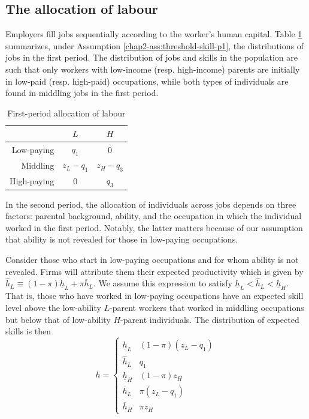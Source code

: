 \subsection{The allocation of labour} \label{chap2-model-allocation}

Employers fill jobs sequentially according to the worker's human capital. Table \ref{chap2-tab:init-prb-p1} summarizes, under Assumption \ref{chap2-ass:threshold-skill-p1}, the distributions of jobs in the first period. The distribution of jobs and skills in the population are such that only workers with low-income (resp. high-income) parents are initially in low-paid (resp. high-paid) occupations, while both types of individuals are found in middling jobs in the first period.

\begin{table}[!htb]
    \centering
    \caption{First-period allocation of labour}
    \label{chap2-tab:init-prb-p1}
    \begin{threeparttable}
        \setlength{\tabcolsep}{12pt}
        \setlength{\extrarowheight}{6pt}
        \begin{tabular}{r|c|c}
            & $L$ & $H$ \\
            \midrule
            Low-paying & $q_1$ & $0$ \\
            Middling & $z_L - q_1$ & $z_H - q_3$ \\
            High-paying & $0$ & $q_3$
        \end{tabular}
    \end{threeparttable}
\end{table}

In the second period, the allocation of individuals across jobs depends on three factors: parental background, ability, and the occupation in which the individual worked in the first period. Notably, the latter matters because of our assumption that ability is not revealed for those in low-paying occupations. 

Consider those who start in low-paying occupations and for whom ability is not revealed. Firms will attribute them their expected productivity which is given by $\widehat{h}_L\equiv (1-\pi )\underline{h}_{L}+\pi \overline{h}_{L}$. We assume this expression to satisfy $ \underline{h}_{L} < \widehat{h}_L < \underline{h}_{H} $. That is, those who have worked in low-paying occupations have an expected skill level above the low-ability $L$-parent workers that worked in middling occupations but below that of low-ability $H$-parent individuals. The distribution of expected skills is then
\begin{equation*}
    h=\left\{ 
        \begin{array}{cc}
            \underline{h}_{L} & (1-\pi )(z_{L}-q_1) \\ 
            \widehat{h}_L & q_{1} \\ 
            \underline{h}_{H} & (1-\pi )z_{H} \\ 
            \overline{h}_{L} & \pi (z_{L}-q_1) \\ 
            \overline{h}_{H} & \pi z_{H}
        \end{array}
    \right.  
\end{equation*}

